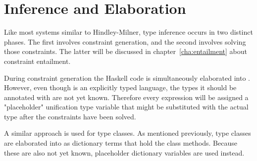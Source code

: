 \chapter{Inference and Elaboration}
\label{cha:inference}
Like most systems similar to Hindley-Milner\cite{hindley}\cite{damas-milner},
type inference occurs in two
distinct phases. The first involves constraint generation, and the second
involves solving those constraints. The latter will be discussed in
chapter~\ref{cha:entailment} about constraint entailment.

During constraint generation the Haskell code is simultaneously elaborated into
\systemfc. However, even though \systemfc is an explicitly typed language,
the types it should be annotated with are not yet known. Therefore every
expression will be assigned a "placeholder" unification type variable that might
be substituted with the actual type after the constraints have been solved.

A similar approach is used for type classes. As mentioned previously, type
classes are elaborated into \systemfc as dictionary terms that hold the class
methods. Because these are also not yet known, placeholder dictionary variables
are used instead.


